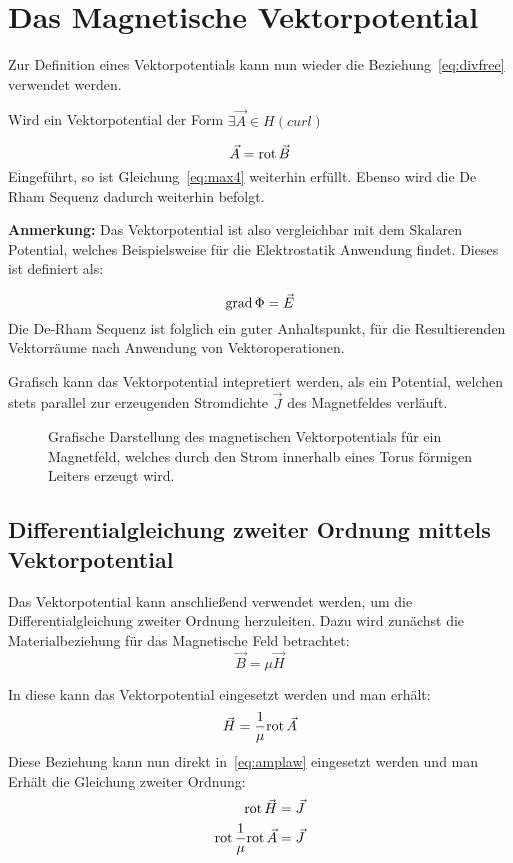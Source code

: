 \section{Das Magnetische Vektorpotential}
Zur Definition eines Vektorpotentials kann nun wieder die Beziehung~\ref{eq:divfree} verwendet werden. 
\par
Wird ein Vektorpotential der Form $\exists\vec{A}\in H(curl)$
\par
\begin{equation}
	\vec{A} = \mathrm{rot}\,\vec{B}
\end{equation}
Eingef\"uhrt, so ist Gleichung~\ref{eq:max4} weiterhin erf\"ullt. Ebenso wird die De Rham Sequenz dadurch weiterhin befolgt. 
\par
\textbf{Anmerkung:} Das Vektorpotential ist also vergleichbar mit dem Skalaren Potential, welches Beispielsweise f\"ur die Elektrostatik Anwendung findet. Dieses ist definiert als:
\par
\begin{equation}
	\mathrm{grad}\, \Phi = \vec{E}
\end{equation}
Die De-Rham Sequenz ist folglich ein guter Anhaltspunkt, f\"ur die Resultierenden Vektorr\"aume nach Anwendung von Vektoroperationen.

\newpage

Grafisch kann das Vektorpotential intepretiert werden, als ein Potential, welchen stets parallel zur erzeugenden Stromdichte $\vec{J}$ des Magnetfeldes verl\"auft.
\begin{figure}[h]
	\centering
	\def\svgwidth{0.7\textwidth}
	
	\caption{Grafische Darstellung des magnetischen Vektorpotentials f\"ur ein Magnetfeld, welches durch den Strom innerhalb eines Torus f\"ormigen Leiters erzeugt wird.}
	\label{fig:vecpot}
\end{figure}

\subsection{Differentialgleichung zweiter Ordnung mittels Vektorpotential}
Das Vektorpotential kann anschlie\ss{}end verwendet werden, um die Differentialgleichung zweiter Ordnung herzuleiten. Dazu wird zun\"achst die Materialbeziehung f\"ur das Magnetische Feld betrachtet:
\begin{equation}
	\vec{B} = \mu\vec{H} 
\end{equation}
\par
In diese kann das Vektorpotential eingesetzt werden und man erh\"alt:
\begin{equation}
	\vec{H} = \frac{1}{\mu} \mathrm{rot}\,\vec{A}
\end{equation}
Diese Beziehung kann nun direkt in~\ref{eq:amplaw} eingesetzt werden und man Erh\"alt die Gleichung zweiter Ordnung:
\begin{align}
	\mathrm{rot}\, \vec{H} &= \vec{J} \\
	\mathrm{rot}\, \frac{1}{\mu} \mathrm{rot}\,\vec{A} &= \vec{J}
\end{align}



